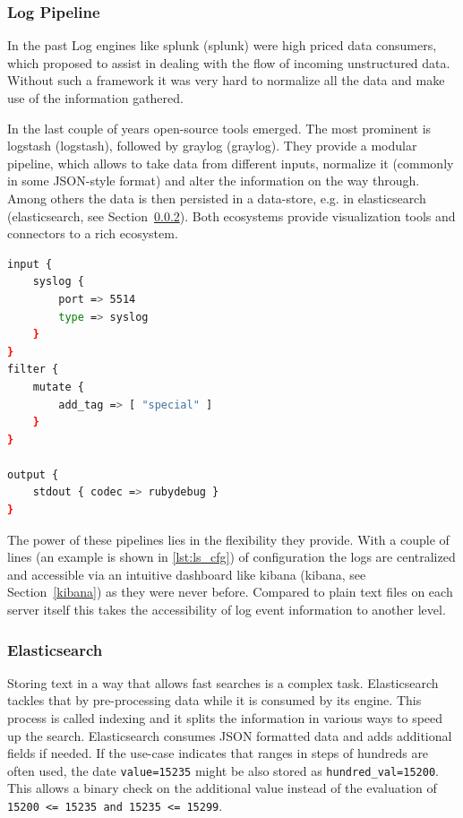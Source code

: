 \subsubsection{Log Pipeline}
In the past Log engines like \gls{splunk} (\glsdesc{splunk}) were high priced data consumers, which proposed to assist in dealing with the
flow of incoming unstructured data. Without such a framework it was very hard to normalize all the data and make use of the information gathered.

In the last couple of years open-source tools emerged. The most prominent is \gls{logstash} (\glsdesc{logstash}),
followed by \gls{graylog} (\glsdesc{graylog}).
They provide a modular pipeline, which allows to take data from different inputs, normalize it (commonly in some JSON-style format)
and alter the information on the way through. Among others the data is then persisted in a data-store, e.g. in \gls{elasticsearch} (\glsdesc{elasticsearch}, see Section~\ref{elasticsearch}).
Both ecosystems provide visualization tools and connectors to a rich ecosystem.

\begin{lstlisting}[language=bash,label={lst:ls_cfg},
    caption={Example of a basic Logstash configuration which consumes events via syslog endpoint, adds a tag and writes events to stdout.}]
input {
    syslog {
        port => 5514
        type => syslog
    }
}
filter {
    mutate {
        add_tag => [ "special" ]
    }
}

output {
    stdout { codec => rubydebug }
}
\end{lstlisting}

The power of these pipelines lies in the flexibility they provide. With a couple of lines (an example is shown in \autoref{lst:ls_cfg}) of
configuration the logs are centralized and accessible via an intuitive dashboard like \gls{kibana} (\glsdesc{kibana}, see Section~\ref{kibana}) as they were never before. Compared to plain text files on each server itself this takes the accessibility of log event information to another level.

\subsubsection{Elasticsearch}
\label{elasticsearch}
Storing text in a way that allows fast searches is a complex task. Elasticsearch tackles that by pre-processing data while it is consumed by its engine.
This process is called indexing and it splits the information in various ways to speed up the search.
Elasticsearch consumes JSON formatted data and adds additional fields if needed.
If the use-case indicates that ranges in steps of hundreds are often used, the date \lstinline{value=15235} might be also stored
as \lstinline{hundred_val=15200}. This allows a binary check on the additional value instead of the evaluation of \lstinline{15200 <= 15235 and 15235 <= 15299}.

